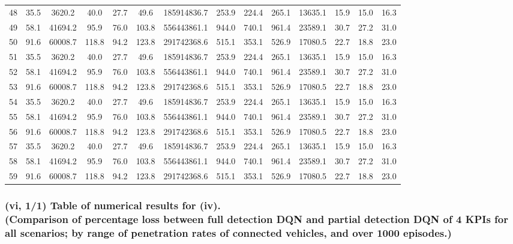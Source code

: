\begin{table}[htbp]
\begin{tabular}{|c|c|c|c|c|c|c|c|c|c|c|c|c|c|}
48 &  35.5 &  3620.2 &  40.0 &  27.7 &  49.6 &  185914836.7 &  253.9 &  224.4 &  265.1 & 13635.1 & 15.9 & 15.0 & 16.3 \\
49 &  58.1 & 41694.2 &  95.9 &  76.0 & 103.8 &  556443861.1 &  944.0 &  740.1 &  961.4 & 23589.1 & 30.7 & 27.2 & 31.0 \\
50 &  91.6 & 60008.7 & 118.8 &  94.2 & 123.8 &  291742368.6 &  515.1 &  353.1 &  526.9 & 17080.5 & 22.7 & 18.8 & 23.0 \\
51 &  35.5 &  3620.2 &  40.0 &  27.7 &  49.6 &  185914836.7 &  253.9 &  224.4 &  265.1 & 13635.1 & 15.9 & 15.0 & 16.3 \\
52 &  58.1 & 41694.2 &  95.9 &  76.0 & 103.8 &  556443861.1 &  944.0 &  740.1 &  961.4 & 23589.1 & 30.7 & 27.2 & 31.0 \\
53 &  91.6 & 60008.7 & 118.8 &  94.2 & 123.8 &  291742368.6 &  515.1 &  353.1 &  526.9 & 17080.5 & 22.7 & 18.8 & 23.0 \\
54 &  35.5 &  3620.2 &  40.0 &  27.7 &  49.6 &  185914836.7 &  253.9 &  224.4 &  265.1 & 13635.1 & 15.9 & 15.0 & 16.3 \\
55 &  58.1 & 41694.2 &  95.9 &  76.0 & 103.8 &  556443861.1 &  944.0 &  740.1 &  961.4 & 23589.1 & 30.7 & 27.2 & 31.0 \\
56 &  91.6 & 60008.7 & 118.8 &  94.2 & 123.8 &  291742368.6 &  515.1 &  353.1 &  526.9 & 17080.5 & 22.7 & 18.8 & 23.0 \\
57 &  35.5 &  3620.2 &  40.0 &  27.7 &  49.6 &  185914836.7 &  253.9 &  224.4 &  265.1 & 13635.1 & 15.9 & 15.0 & 16.3 \\
58 &  58.1 & 41694.2 &  95.9 &  76.0 & 103.8 &  556443861.1 &  944.0 &  740.1 &  961.4 & 23589.1 & 30.7 & 27.2 & 31.0 \\
59 &  91.6 & 60008.7 & 118.8 &  94.2 & 123.8 &  291742368.6 &  515.1 &  353.1 &  526.9 & 17080.5 & 22.7 & 18.8 & 23.0 \\
\hline
\end{tabular}
\end{table}

\restoregeometry

\pagebreak

\subsubsection*{(vi, 1/1) Table of numerical results for (iv). \\
(Comparison of percentage loss between full detection DQN and partial detection DQN of 4 KPIs for all scenarios; by range of penetration rates of connected vehicles, and over 1000 episodes.)}

